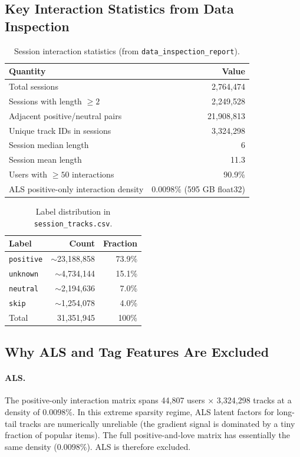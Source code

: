 \documentclass[11pt]{article}
\begin{document}
\subsection{Key Interaction Statistics from Data Inspection}

\begin{table}[H]
\centering
\caption{Session interaction statistics (from \texttt{data\_inspection\_report}).}
\begin{tabular}{lr}
\toprule
\textbf{Quantity} & \textbf{Value} \\
\midrule
Total sessions & 2,764,474 \\
Sessions with length $\ge 2$ & 2,249,528 \\
Adjacent positive/neutral pairs & 21,908,813 \\
Unique track IDs in sessions & 3,324,298 \\
Session median length & 6 \\
Session mean length & 11.3 \\
Users with $\ge 50$ interactions & 90.9\% \\
\midrule
ALS positive-only interaction density & 0.0098\% (595 GB float32) \\
\bottomrule
\end{tabular}
\end{table}

\begin{table}[H]
\centering
\caption{Label distribution in \texttt{session\_tracks.csv}.}
\begin{tabular}{lrr}
\toprule
\textbf{Label} & \textbf{Count} & \textbf{Fraction} \\
\midrule
\texttt{positive} & $\sim$23,188,858 & 73.9\% \\
\texttt{unknown}  & $\sim$4,734,144  & 15.1\% \\
\texttt{neutral}  & $\sim$2,194,636  & 7.0\%  \\
\texttt{skip}     & $\sim$1,254,078  & 4.0\%  \\
\midrule
Total & 31,351,945 & 100\% \\
\bottomrule
\end{tabular}
\end{table}

\subsection{Why ALS and Tag Features Are Excluded}

\paragraph{ALS.}
The positive-only interaction matrix spans 44,807 users $\times$ 3,324,298 tracks
at a density of $0.0098\%$. In this extreme sparsity regime, ALS latent factors
for long-tail tracks are numerically unreliable (the gradient signal is
dominated by a tiny fraction of popular items). The full positive-and-love
matrix has essentially the same density ($0.0098\%$). ALS is therefore excluded.
\end{document}
